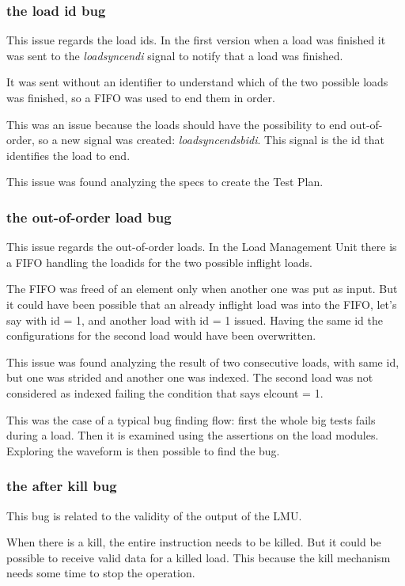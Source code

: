 \subsubsection{the load id bug}
This issue regards the load ids. In the first version when a load was finished it was sent to the \emph{load\+sync\+end\+i} signal to notify that a load was finished.

It was sent without an identifier to understand which of the two possible loads was finished, so a FIFO was used to end them in order.

This was an issue because the loads should have the possibility to end out-of-order, so a new signal was created: \emph{load\+sync\+end\+sb\+id\+i}. This signal is the id that identifies the load to end.

This issue was found analyzing the specs to create the Test Plan.

\subsubsection{the out-of-order load bug}
This issue regards the out-of-order loads. In the Load Management Unit there is a FIFO handling the load\+ids for the two possible inflight loads.

The FIFO was freed of an element only when another one was put as input. But it could have been possible that an already inflight load was into the FIFO, let's say with id = 1, and another load with id = 1 issued.
Having the same id the configurations for the second load would have been overwritten.

This issue was found analyzing the result of two consecutive loads, with same id, but one was strided and another one was indexed. The second load was not considered as indexed failing the condition that says el\+count = 1.

This was the case of a typical bug finding flow: first the whole big tests fails during a load. Then it is examined using the assertions on the load modules. Exploring the waveform is then possible to find the bug.

\subsubsection{the after kill bug}
This bug is related to the validity of the output of the LMU.

When there is a kill, the entire instruction needs to be killed. But it could be possible to receive valid data for a killed load. This because the kill mechanism needs some time to stop the operation.


